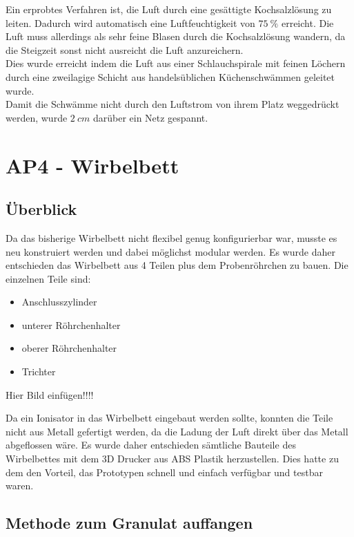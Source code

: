 Ein erprobtes Verfahren ist, die Luft durch eine gesättigte Kochsalzlösung zu leiten. Dadurch wird automatisch eine Luftfeuchtigkeit von $\SI{75}{\%}$ erreicht. Die Luft muss allerdings als sehr feine Blasen durch die Kochsalzlösung wandern, da die Steigzeit sonst nicht ausreicht die Luft anzureichern. \\
Dies wurde erreicht indem die Luft aus einer Schlauchspirale mit feinen Löchern durch eine zweilagige Schicht aus handelsüblichen Küchenschwämmen geleitet wurde. \\
Damit die Schwämme nicht durch den Luftstrom von ihrem Platz weggedrückt werden, wurde $\SI{2}{cm}$ darüber ein Netz gespannt.

\newpage

\section{AP4 - Wirbelbett}


\subsection{Überblick}

Da das bisherige Wirbelbett nicht flexibel genug konfigurierbar war, musste es neu konstruiert werden und dabei möglichst modular werden. Es wurde daher entschieden das Wirbelbett aus 4 Teilen plus dem Probenröhrchen zu bauen. Die einzelnen Teile sind:

\begin{itemize}
	\item Anschlusszylinder
	\item unterer Röhrchenhalter
	\item oberer Röhrchenhalter
	\item Trichter
\end{itemize}


Hier Bild einfügen!!!!


Da ein Ionisator in das Wirbelbett eingebaut werden sollte, konnten die Teile nicht aus Metall gefertigt werden, da die Ladung der Luft direkt über das Metall abgeflossen wäre. Es wurde daher entschieden sämtliche Bauteile des Wirbelbettes mit dem 3D Drucker aus ABS Plastik herzustellen. Dies hatte zu dem den Vorteil, das Prototypen schnell und einfach verfügbar und testbar waren. 


\subsection{Methode zum Granulat auffangen}

